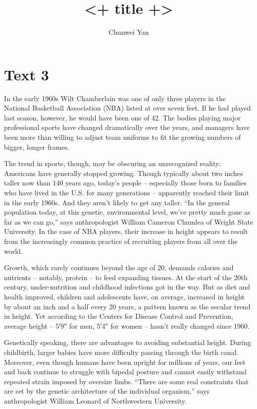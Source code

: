 \documentclass[a4paper]{ctexart}
\author{Chunwei Yan}
\title{<+ title +>}
\begin{document}
    \maketitle

\section{Text 3}
In the early 1960s Wilt Chamberlain was one of only three players in the National Basketball Association (NBA) listed at over seven feet. If he had played last season, however, he would have been one of 42. The bodies playing major professional sports have changed dramatically over the years, and managers have been more than willing to adjust team uniforms to fit the growing numbers of bigger, longer frames.
\par
The trend in sports, though, may be obscuring an unrecognized reality: Americans have generally stopped growing. Though typically about two inches taller now than 140 years ago, today’s people – especially those born to families who have lived in the U.S. for many generations – apparently reached their limit in the early 1960s. And they aren’t likely to get any taller. “In the general population today, at this genetic, environmental level, we’ve pretty much gone as far as we can go,” says anthropologist William Cameron Chumlea of Wright State University. In the case of NBA players, their increase in height appears to result from the increasingly common practice of recruiting players from all over the world.
\par
Growth, which rarely continues beyond the age of 20, demands calories and nutrients – notably, protein – to feed expanding tissues. At the start of the 20th century, under-nutrition and childhood infections got in the way. But as diet and health improved, children and adolescents have, on average, increased in height by about an inch and a half every 20 years, a pattern known as the secular trend in height. Yet according to the Centers for Disease Control and Prevention, average height – 5′9″ for men, 5′4″ for women – hasn’t really changed since 1960.
\par
Genetically speaking, there are advantages to avoiding substantial height. During childbirth, larger babies have more difficulty passing through the birth canal. Moreover, even though humans have been upright for millions of years, our feet and back continue to struggle with bipedal posture and cannot easily withstand repeated strain imposed by oversize limbs. “There are some real constraints that are set by the genetic architecture of the individual organism,” says anthropologist William Leonard of Northwestern University.
\end{document}
